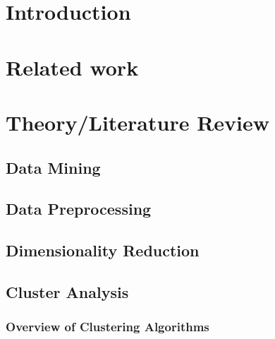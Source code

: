 \section{Introduction}
\label{section:Introduction}




\section{Related work}
\label{section:RelatedWork}




\section{Theory/Literature Review}
\label{section:Theory}
% 

  \subsection{Data Mining}
  \label{section:TheoryDataMining}
  
    
  \subsection{Data Preprocessing}
  \label{section:TheoryDataPreprocessing}
  

  \subsection{Dimensionality Reduction}
  \label{section:TheoryDimensionalityReduction}
  
  
  \subsection{Cluster Analysis}
  \label{section:TheoryClusterAnalysis}
  

    \subsubsection{Overview of Clustering Algorithms}
    \label{section:TheoryOverviewClusteringAlgorithms}
    

